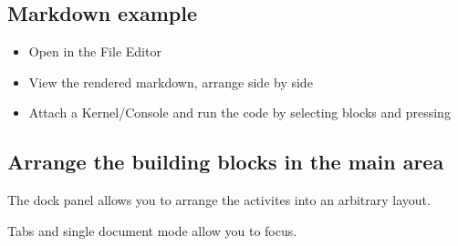 \documentclass[letterpaper,10pt,english]{sphinxmanual}
\begin{document}
\subsection{Markdown example}
\label{\detokenize{markdown:markdown-example}}\begin{itemize}
\item {} 
Open  in the File Editor

\item {} 
View the rendered markdown, arrange side by side

\item {} 
Attach a Kernel/Console and run the code by selecting blocks and pressing

\end{itemize}


\subsection{Arrange the building blocks in the main area}
\label{\detokenize{markdown:arrange-the-building-blocks-in-the-main-area}}
The dock panel allows you to arrange the activites into an
arbitrary layout.

Tabs and single document mode allow you to focus.
\end{document}
